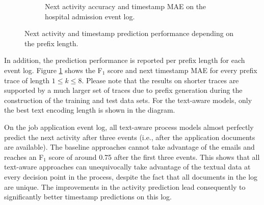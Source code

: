 \begin{figure}[!htbp]
\begin{subfigure}{\textwidth}
		\caption{Next activity accuracy and timestamp MAE on the hospital admission event log.}
	\end{subfigure}
	\caption[Next activity and timestamp prediction performance depending on the prefix length]{Next activity and timestamp prediction performance depending on the prefix length.}
	\label{fig:next-activity-prefix}
\end{figure}

In addition, the prediction performance is reported per prefix length for each event log.
Figure \ref{fig:next-activity-prefix} shows the F$_1$ score and next timestamp MAE for every prefix trace of length $1 \leq k \leq 8$.
Please note that the results on shorter traces are supported by a much larger set of traces due to prefix generation during the construction of the training and test data sets.
For the text-aware models, only the best text encoding length is shown in the diagram.

On the job application event log, all text-aware process models almost perfectly predict the next activity after three events (i.e., after the application documents are available).
The baseline approaches cannot take advantage of the emails and reaches an F$_1$ score of around 0.75 after the first three events.
This shows that all text-aware approaches can unequivocally take advantage of the textual data at every decision point in the process, despite the fact that all documents in the log are unique.
The improvements in the activity prediction lead consequently to significantly better timestamp predictions on this log.

